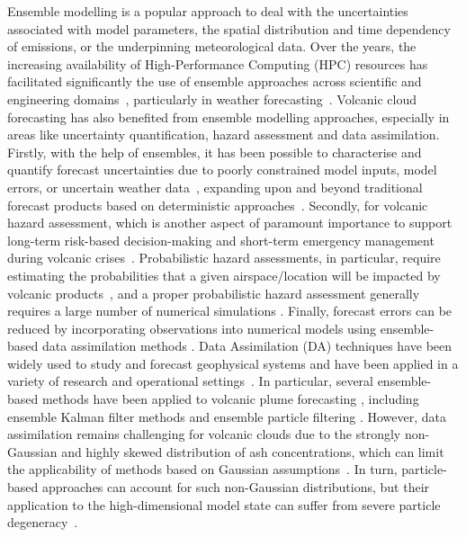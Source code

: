 %
%
Ensemble modelling is a popular approach to deal with the uncertainties associated with model parameters, the spatial distribution and time dependency of emissions, or the underpinning meteorological data. Over the years, the increasing availability of High-Performance Computing (HPC) resources has facilitated significantly the use of ensemble approaches across scientific and engineering domains~\citep{wu2021}, particularly in weather forecasting~\citep{toth1997,leutbecher2008,bauer2015}.
%
%
Volcanic cloud forecasting has also benefited from ensemble modelling approaches, especially in areas like uncertainty quantification, hazard assessment and data assimilation. Firstly, with the help of ensembles, it has been possible to characterise and quantify forecast uncertainties due to poorly constrained model inputs, model errors, or uncertain weather data~\citep{stefanescu2014}, expanding upon and beyond traditional forecast products based on deterministic approaches~\citep{folch2022}. Secondly, for volcanic hazard assessment, which is another aspect of paramount importance to support long-term risk-based decision-making and short-term emergency management during volcanic crises~\citep{sandri2025}. Probabilistic hazard assessments, in particular, require estimating the probabilities that a given airspace/location will be impacted by volcanic products~\citep{marzocchi2006}, and a proper probabilistic hazard assessment generally requires a large number of numerical simulations \citep{madankan2014,titos2022}. Finally, forecast errors can be reduced by incorporating observations into numerical models using ensemble-based data assimilation methods \citep{kalnay2002}. Data Assimilation (DA) techniques have been widely used to study and forecast geophysical systems and have been applied in a variety of research and operational settings~\citep{carrasi2018}. In particular, several ensemble-based methods have been applied to volcanic plume forecasting \citep{folch2023}, including ensemble Kalman filter methods \citep{fu2016,fu2017,osores2020,pardini2020,mingari2022} and ensemble particle filtering \citep{zidikheri2021,zidikheri2021b}.
%
However, data assimilation remains challenging for volcanic clouds due to the strongly non-Gaussian and highly skewed distribution of ash concentrations, which can limit the applicability of methods based on Gaussian assumptions~\citep{mingari2023}. In turn, particle-based approaches can account for such non-Gaussian distributions, but their application to the high-dimensional model state can suffer from severe particle degeneracy~\citep{vanleeuwen2009}.

